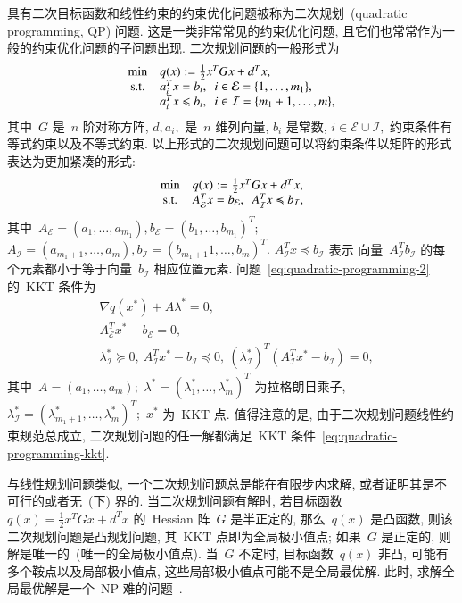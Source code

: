 
具有二次目标函数和线性约束的约束优化问题被称为二次规划~(quadratic programming, QP) 问题. 这是一类非常常见的约束优化问题, 且它们也常常作为一般的约束优化问题的子问题出现. 二次规划问题的一般形式为
\begin{equation}
\label{eq:quadratic-programming-1}
\begin{array}{cl}
\min & q({x}) := \frac{1}{2} {x}^T G {x} + {d}^T {x}, \\
{\rm s.t.} & {a}_i^T {x} = b_i, ~~ i \in \mathcal{E} = \{1, \ldots, m_1\}, \\
& {a}_i^T {x} \leqslant b_i, ~~ i \in \mathcal{I} = \{m_1 + 1, \ldots, m\},
\end{array}
\end{equation}
其中~$G$ 是~$n$ 阶对称方阵, ${d}, {a}_i,$ 是~$n$ 维列向量, $b_i$ 是常数, $i \in \mathcal{E} \cup \mathcal{I},$ 约束条件有等式约束以及不等式约束. 以上形式的二次规划问题可以将约束条件以矩阵的形式表达为更加紧凑的形式:
\begin{equation}
\label{eq:quadratic-programming-2}
\begin{array}{cl}
\min & q({x}) := \frac{1}{2} {x}^T G {x} + {d}^T {x}, \\
{\rm s.t.} & A^T_{\mathcal{E}} {x} = {b}_{\mathcal{E}}, ~~ A^T_{\mathcal{I}} x \preccurlyeq {b}_{\mathcal{I}},
\end{array}
\end{equation}
其中~$A_{\mathcal{E}} = ({a}_1, \ldots, {a}_{m_1}), {b}_{\mathcal{E}} = (b_1, \ldots, b_{m_1})^T;$ $A_{\mathcal{I}} = ({a}_{m_1+1}, \ldots, {a}_m), {b}_{\mathcal{I}} = (b_{m_1+1}1, \ldots, b_m)^T.$ $A^T_{\mathcal{I}} {x} \preccurlyeq {b}_{\mathcal{I}}$ 表示
向量~$A^T_{\mathcal{I}} {b}_{\mathcal{I}}$ 的每个元素都小于等于向量~${b}_{\mathcal{I}}$ 相应位置元素. 问题~\eqref{eq:quadratic-programming-2} 的~KKT 条件为
\begin{equation}
\label{eq:quadratic-programming-kkt}
\begin{aligned}
& \nabla q({x}^*) + A {\lambda}^* = {0}, \\
& A^T_{\mathcal{E}} {x}^* - {b}_{\mathcal{E}} = {0}, \\
& {\lambda}^*_{\mathcal{I}} \succcurlyeq {0}, ~ A_{\mathcal{I}}^T {x}^* - {b}_{\mathcal{I}} \preccurlyeq {0}, ~ ({\lambda}^*_{\mathcal{I}})^T (A_{\mathcal{I}}^T {x}^* - {b}_{\mathcal{I}}) = {0},
\end{aligned}
\end{equation}
其中~$A = ({a}_1, \ldots, {a}_m);$ ${\lambda}^* = (\lambda_1^*, \ldots, \lambda_m^*)^T$ 为拉格朗日乘子, ${\lambda}^*_{\mathcal{I}} = (\lambda_{m_1+1}^*, \ldots, \lambda_m^*)^T;$ ${x}^*$ 为~KKT 点. 值得注意的是, 由于二次规划问题线性约束规范总成立, 二次规划问题的任一解都满足~KKT
条件~\eqref{eq:quadratic-programming-kkt}.

与线性规划问题类似, 一个二次规划问题总是能在有限步内求解, 或者证明其是不可行的或者无~(下) 界的. 当二次规划问题有解时, 若目标函数~$q({x}) = \frac{1}{2} {x}^T G {x} + {d}^T {x}$ 的~Hessian 阵~$G$ 是半正定的, 那么~$q({x})$ 是凸函数, 则该二次规划问题是凸规划问题, 其~KKT 点即为全局极小值点; 如果~$G$ 是正定的, 则解是唯一的~(唯一的全局极小值点). 当~$G$ 不定时, 目标函数~$q({x})$ 非凸, 可能有多个鞍点以及局部极小值点, 这些局部极小值点可能不是全局最优解. 此时, 求解全局最优解是一个~NP-难的问题~\cite{Murty_1987}.
